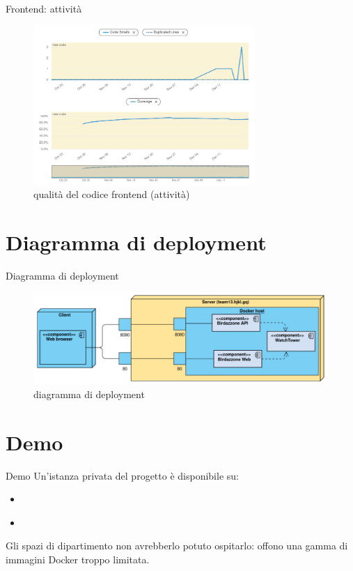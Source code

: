 \documentclass{beamer}
\begin{document}
\begin{frame}{Frontend: attività}
	\begin{figure}
		\includegraphics[width=0.75\textwidth]{quality-frontend-activity}
		\caption{qualità del codice frontend (attività)}
	\end{figure}
\end{frame}

\section{Diagramma di deployment}
\begin{frame}{Diagramma di deployment}
	\begin{figure}
		\includegraphics[width=\textwidth]{deployment}
		\caption{diagramma di deployment}
	\end{figure}
\end{frame}

\section{Demo}
\begin{frame}{Demo}
	Un'istanza privata del progetto è disponibile su:
	\begin{itemize}
		\item \href{http://team13.hjkl.gq:8000/swagger/index.html}{}
		\item \href{http://team13.hjkl.gq}{}
	\end{itemize}
	Gli spazi di dipartimento non avrebberlo potuto ospitarlo: offono una gamma di
	immagini Docker troppo limitata.
\end{frame}
\end{document}
